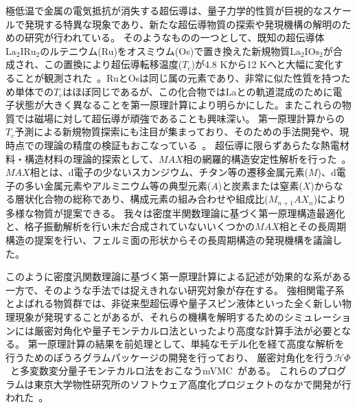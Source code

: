 極低温で金属の電気抵抗が消失する超伝導は、量子力学的性質が巨視的なスケールで発現する特異な現象であり、新たな超伝導物質の探索や発現機構の解明のための研究が行われている。
そのようなものの一つとして、既知の超伝導体$\textrm{La}_2\textrm{IRu}_2$のルテニウム(Ru)をオスミウム(Os)で置き換えた新規物質$\textrm{La}_2\textrm{IOs}_2$が合成され、この置換により超伝導転移温度($T_c$)が4.8 Kから12 Kへと大幅に変化することが観測された~\cite{kawamura_la2ios2}。RuとOsは同じ属の元素であり、非常に似た性質を持つため単体での$T_c$はほぼ同じであるが、この化合物ではLaとの軌道混成のために電子状態が大きく異なることを第一原理計算により明らかにした。またこれらの物質では磁場に対して超伝導が頑強であることも興味深い。
第一原理計算からの$T_c$予測による新規物質探索にも注目が集まっており、そのための手法開発や、現時点での理論の精度の検証もおこなっている~\cite{kawamura_yitp}。
超伝導に限らずあらたな熱電材料・構造材料の理論的探索として、$MAX$相の網羅的構造安定性解析を行った~\cite{kawamura_max}。
$MAX$相とは、d電子の少ないスカンジウム、チタン等の遷移金属元素($M$)、d電子の多い金属元素やアルミニウム等の典型元素($A$)と炭素または窒素($X$)からなる層状化合物の総称であり、構成元素の組み合わせや組成比($M_{n+1}AX_n$)により多様な物質が提案できる。
我々は密度半関数理論に基づく第一原理構造最適化と、格子振動解析を行い未だ合成されていないいくつかの$MAX$相とその長周期構造の提案を行い、フェルミ面の形状からその長周期構造の発現機構を議論した。

このように密度汎関数理論に基づく第一原理計算による記述が効果的な系がある一方で、そのような手法では捉えきれない研究対象が存在する。
強相関電子系とよばれる物質群では、非従来型超伝導や量子スピン液体といった全く新しい物理現象が発現することがあるが、それらの機構を解明するためのシミュレーションには厳密対角化や量子モンテカルロ法といったより高度な計算手法が必要となる。
第一原理計算の結果を前処理として、単純なモデル化を経て高度な解析を行うためのぽうろグラムパッケージの開発を行っており、
厳密対角化を行う$\mathcal{H}\Phi$~\cite{kawamura_hphi,kawamura_hpci3}と多変数変分量子モンテカルロ法をおこなうmVMC~\cite{kawamura_hpci2}がある。
これらのプログラムは東京大学物性研究所のソフトウェア高度化プロジェクトのなかで開発が行われた~\cite{kawamura_hpci1, kawamura_kotai}。
